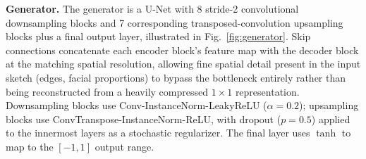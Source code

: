 \documentclass[conference]{IEEEtran}
\begin{document}
\textbf{Generator.} The generator is a U-Net \cite{ronneberger2015unet} with 8
stride-2 convolutional downsampling blocks and 7 corresponding transposed-convolution
upsampling blocks plus a final output layer, illustrated in
Fig.~\ref{fig:generator}. Skip connections concatenate each encoder block's feature map
with the decoder block at the matching spatial resolution, allowing fine spatial detail
present in the input sketch (edges, facial proportions) to bypass the bottleneck
entirely rather than being reconstructed from a heavily compressed
$1\times1$ representation. Downsampling blocks use Conv-InstanceNorm-LeakyReLU
($\alpha=0.2$); upsampling blocks use ConvTranspose-InstanceNorm-ReLU, with dropout
($p=0.5$) applied to the innermost layers as a stochastic regularizer. The final layer
uses $\tanh$ to map to the $[-1,1]$ output range.
\end{document}
